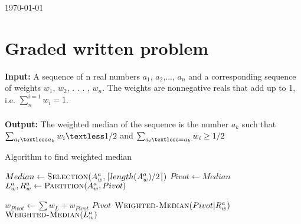 \documentclass[8pt]{article}
\DeclarePairedDelimiter\ceil{\lceil}{\rceil}
\begin{document}
\hfill \small{\today} \\
\setlength{\fboxrule}{.5mm}\setlength{\fboxsep}{1.2mm}
\newlength{\boxlength}\setlength{\boxlength}{\textwidth}
\addtolength{\boxlength}{-4mm}
\begin{center}\end{center}
\vspace{5mm}

\section{Graded written problem}

\textbf{Input:} A sequence of n real numbers $a_1$, $a_2$,..., $a_n$ and a corresponding sequence of weights $w_1$, $w_2$, . . . , $w_n$. The weights are nonnegative reals that add up to 1, i.e. $\sum_n^{i=1} w_i = 1$. \\
\\
\textbf{Output:} The weighted median of the sequence is the number $a_k$ such that
$\sum_{a_i \textless a_k} w_i \textless 1/2$ and $\sum_{a_i \textless= a_k} w_i \geq 1/2$

\begin{algorithm}
\caption{Algorithm to find weighted median}\label{euclid}
\begin{algorithmic}[1]

    \State {} 
\EndIf

\State $Median \leftarrow \Call{Selection}{A_w^a, \ceil{length(A_w^a)/2}}$ 
    \State $Pivot \leftarrow Median$
    \State $L_{w}^{a},R_{w}^{a} \leftarrow \Call{Partition}{A_w^a, Pivot}$

        \State $w_{Pivot} \leftarrow \sum w_L + w_{Pivot}$
            \State \Return ${Pivot}$
        \EndIf
        \State $\Call{Weighted-Median}{Pivot|R_w^a}$
    \Else
        \State $\Call{Weighted-Median}{L_w^a}$
    \EndIf

\EndProcedure
\end{algorithmic}
\end{algorithm}
\end{document}
